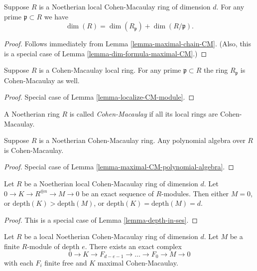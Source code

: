 \begin{lemma}
\label{lemma-CM-dim-formula}
Suppose $R$ is a Noetherian local Cohen-Macaulay ring of dimension $d$.
For any prime $\mathfrak p \subset R$ we have
$$
\dim(R) = \dim(R_{\mathfrak p}) + \dim(R/\mathfrak p).
$$
\end{lemma}

\begin{proof}
Follows immediately from Lemma \ref{lemma-maximal-chain-CM}.
(Also, this is a special case of Lemma \ref{lemma-dim-formula-maximal-CM}.)
\end{proof}

\begin{lemma}
\label{lemma-localize-CM}
Suppose $R$ is a Cohen-Macaulay local ring.
For any prime $\mathfrak p \subset R$ the
ring $R_{\mathfrak p}$ is Cohen-Macaulay as well.
\end{lemma}

\begin{proof}
Special case of Lemma \ref{lemma-localize-CM-module}.
\end{proof}

\begin{definition}
\label{definition-ring-CM}
A Noetherian ring $R$ is called {\it Cohen-Macaulay} if all
its local rings are Cohen-Macaulay.
\end{definition}

\begin{lemma}
\label{lemma-CM-polynomial-algebra}
Suppose $R$ is a Noetherian Cohen-Macaulay ring.
Any polynomial algebra over $R$ is Cohen-Macaulay.
\end{lemma}

\begin{proof}
Special case of Lemma \ref{lemma-maximal-CM-polynomial-algebra}.
\end{proof}

\begin{lemma}
\label{lemma-dimension-shift}
Let $R$ be a Noetherian local Cohen-Macaulay ring of dimension $d$.
Let $0 \to K \to R^{\oplus n} \to M \to 0$ be an exact sequence of
$R$-modules. Then either $M = 0$, or $\text{depth}(K) > \text{depth}(M)$, or
$\text{depth}(K) = \text{depth}(M) = d$.
\end{lemma}

\begin{proof}
This is a special case of Lemma \ref{lemma-depth-in-ses}.
\end{proof}

\begin{lemma}
\label{lemma-mcm-resolution}
Let $R$ be a local Noetherian Cohen-Macaulay ring of dimension $d$.
Let $M$ be a finite $R$-module of depth $e$.
There exists an exact complex
$$
0 \to K \to F_{d-e-1} \to \ldots \to F_0 \to M \to 0
$$
with each $F_i$ finite free and $K$ maximal Cohen-Macaulay.
\end{lemma}

